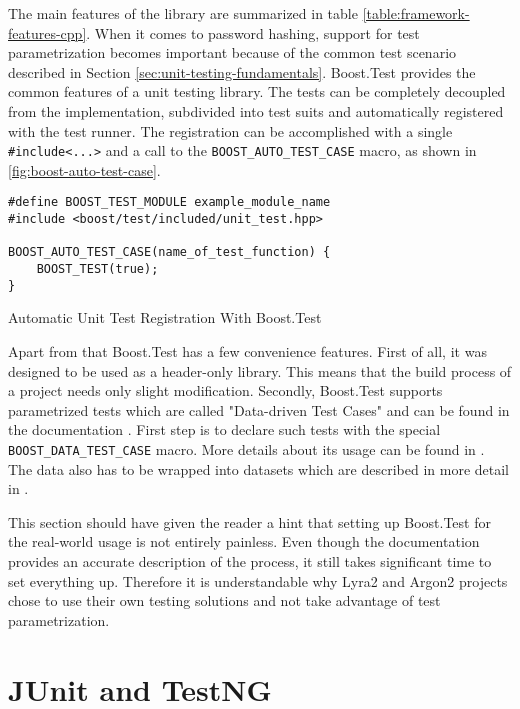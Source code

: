 The main features of the library are summarized in table \ref{table:framework-features-cpp}. When it comes to password hashing, support for test parametrization becomes important because of the common test scenario described in Section \ref{sec:unit-testing-fundamentals}. Boost.Test provides the common features of a unit testing library. The tests can be completely decoupled from the implementation, subdivided  into test suits and automatically registered with the test runner. The registration can be accomplished with a single \texttt{\#include<...>} and a call to the \texttt{BOOST\_AUTO\_TEST\_CASE} macro, as shown in \autoref{fig:boost-auto-test-case}.

\begin{listing}
\centering
\begin{verbatim}
#define BOOST_TEST_MODULE example_module_name
#include <boost/test/included/unit_test.hpp>

BOOST_AUTO_TEST_CASE(name_of_test_function) {
    BOOST_TEST(true);
}
  \end{verbatim}
  \caption{Automatic Unit Test Registration With Boost.Test}
  \label{fig:boost-auto-test-case}
\end{listing}

Apart from that Boost.Test has a few convenience features. First of all, it was designed to be used as a header-only library. This means that the build process of a project needs only slight modification. Secondly, Boost.Test supports parametrized tests which are called "Data-driven Test Cases" and can be found in the documentation \cite{boost:2017:test-data-driven}. First step is to declare such tests with the special \texttt{BOOST\_DATA\_TEST\_CASE} macro. More details about its usage can be found in \cite{boost:2017:test-docs-data-macro}. The data also has to be wrapped into datasets which are described in more detail in \cite{boost:2017:test-docs-dataset}.

This section should have given the reader a hint that setting up Boost.Test for the real-world usage is not entirely painless. Even though the documentation provides an accurate description of the process, it still takes significant time to set everything up. Therefore it is understandable why Lyra2 and Argon2 projects chose to use their own testing solutions and not take advantage of test parametrization.

\section{JUnit and TestNG}
\label{sec:unit-junit-testng}

